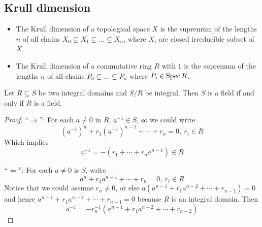 \subsection{Krull dimension}
\begin{definition} \hfill
  \begin{itemize}
    \item 
      The Krull dimension of a topological space $X$ is the supremum of the lengths $n$ of
      all chains $X_0 \subsetneq X_1 \subsetneq \dots \subsetneq X_n$, where $X_i$ are closed irreducible subset of $X$.
    \item
      The Krull dimension of a commutative ring $R$ with $1$ is the
      supremum of the lengths $n$ of all chains $P_0 \subsetneq \dots \subsetneq P_n$ where $P_i \in \operatorname{Spec} R$.
  \end{itemize}
\end{definition}

\begin{prop}
  Let $R \subseteq S$ be two integral domains and $S/R$ be integral. Then $S$ is a field if and only if $R$ is a field.

  \begin{proof}
    ``$\Rightarrow$'': For each $a \neq 0$ in $R$, $a^{-1} \in S$, so we could write
    \[ (a^{-1})^n + r_1 (a^{-1})^{n-1} + \dotsb + r_n = 0, \ r_i \in R \]
    Which implies
    \[ a^{-1}  = - (r_1 + \dotsb + r_n a^{n-1}) \in R \]

    ``$\Leftarrow$'': For each $a \neq 0$ is $S$, write
    \[ a^n + r_1 a^{n-1} + \dotsb + r_n = 0, \ r_i \in R \]
    Notice that we could assume $r_n \neq 0$, or else $a (a^{n-1} + r_1 a^{n-2} + \dotsb + r_{n-1}) = 0$
    and hence $a^{n-1} + r_1 a^{n-2} + \dotsb + r_{n-1} = 0$ because $R$ is an integral domain.
    Then
    \[ a^{-1} = - r_n^{-1} (a^{n-1} + r_1 a^{n-2} + \dotsb + r_{n-2}) \]
  \end{proof}
\end{prop}

